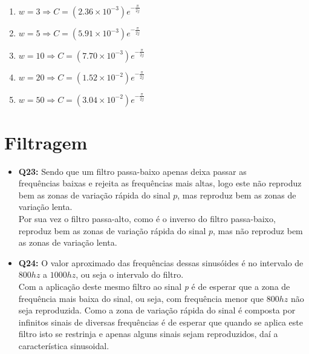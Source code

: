 \documentclass[a4paper, 12pt]{article}
\begin{document}
\begin{itemize}
\begin{enumerate}
              \item[] $w = 3 \Rightarrow C = (2.36 \times 10^{-3})e^{-\frac{\pi}{2j}}$
              \item[] $w = 5 \Rightarrow C = (5.91 \times 10^{-3})e^{-\frac{\pi}{2j}}$
              \item[] $w = 10 \Rightarrow C = (7.70 \times 10^{-3})e^{-\frac{\pi}{2j}}$
              \item[] $w = 20 \Rightarrow C = (1.52 \times 10^{-2})e^{-\frac{\pi}{2j}}$
              \item[] $w = 50 \Rightarrow C = (3.04 \times 10^{-2})e^{-\frac{\pi}{2j}}$
          \end{enumerate}
\end{itemize}
\newpage
\section{Filtragem}
\begin{itemize}
    \item \textbf{Q23:} Sendo que um filtro passa-baixo apenas deixa passar as\\
          frequências baixas e rejeita as frequências mais altas, logo este não reproduz bem as zonas de variação rápida do sinal $p$, mas reproduz bem as zonas de variação lenta.\\
          Por sua vez o filtro passa-alto, como é o inverso do filtro passa-baixo, reproduz bem as zonas de variação rápida do sinal $p$, mas não reproduz bem as zonas de variação lenta.
    \item \textbf{Q24:} O valor aproximado das frequências dessas sinusóides é no intervalo de $800hz$ a $1000hz$, ou seja o intervalo do filtro.\\
          Com a aplicação deste mesmo filtro ao sinal \textit{p} é de esperar que a zona de frequência mais baixa do sinal, ou seja, com frequência menor que $800hz$ não seja reproduzida. Como a zona de variação rápida do sinal é composta por infinitos sinais de diversas frequências é de esperar que quando se aplica este filtro isto se restrinja e apenas alguns sinais sejam reproduzidos, daí a característica sinusoidal.
\end{itemize}
\newpage
\end{document}
